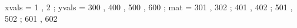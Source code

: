 \begin{functable}
    xvals = 1 , 2 ;
    yvals = 300 , 400 , 500 , 600 ;
    mat   = 301 , 302 ;
            401 , 402 ;
            501 , 502 ;
            601 , 602 
\end{functable}
